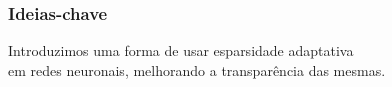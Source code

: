 \documentclass[xetex,aspectratio=169,xcolor,professionalfonts,hyperref]{beamer}
\begin{document}
\begin{frame}[fragile]
    \frametitle{Ideias-chave}
    \fontsize{12pt}{14}\selectfont%
    \vspace*{-1cm}
    \begin{center}
        Introduzimos uma forma de usar {\color{tPeony} esparsidade adaptativa} \\
        em redes neuronais, melhorando a {\color{myDarkYellow} transparência} das mesmas.
    \end{center}
    \vfill
    \begin{columns}[T]
        \small
        \begin{column}{.45\textwidth}
            \centering
        \end{column}
        \begin{column}{.45\textwidth}
            \centering
        \end{column}
    \end{columns}

\end{frame}
\end{document}
